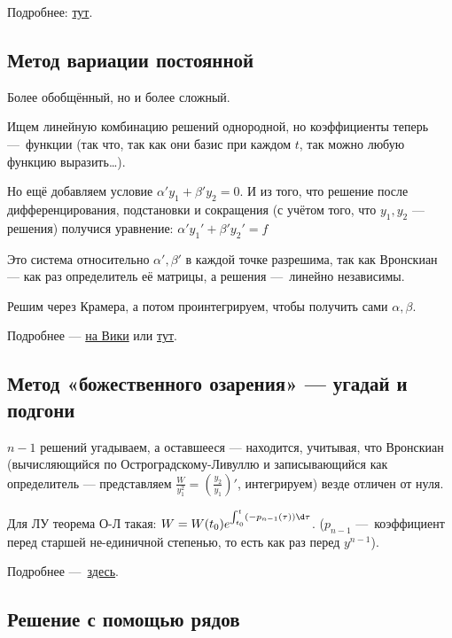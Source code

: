 \documentclass[12pt, a4paper]{article}
\begin{document}
Подробнее: \href{https://tutorial.math.lamar.edu/Classes/DE/UndeterminedCoefficients.aspx}{тут}.

\subsection{Метод вариации постоянной}

Более обобщённый, но и более сложный.

Ищем линейную комбинацию решений однородной, но коэффициенты теперь — функции (так что, так как они базис при каждом $t$, так можно любую функцию выразить…).

Но ещё добавляем условие $\alpha' y_1 + \beta' y_2 = 0$.
И из того, что решение после дифференцирования, подстановки и сокращения (с учётом того, что $y_1, y_2$ — решения) 
получися уравнение: $\alpha' y_1' + \beta' y_2' = f$

Это система относительно $\alpha', \beta'$ в каждой точке разрешима, так как Вронскиан — как раз определитель её матрицы, а решения — линейно независимы.

Решим через Крамера, а потом проинтегрируем, чтобы получить сами $\alpha, \beta$.

Подробнее — \href{https://en.wikipedia.org/wiki/Variation_of_parameters}{на Вики} 
или \href{https://tutorial.math.lamar.edu/classes/de/VariationofParameters.aspx}{тут}.

\subsection{Метод «божественного озарения» — угадай и подгони}

$n - 1$ решений угадываем, а оставшееся — находится, учитывая, 
что Вронскиан (вычисляющийся по Остроградскому-Ливуллю 
и записывающийся как определитель — 
представляем $\frac{W}{y_1^2} = \left(\frac{y_2}{y_1}\right)'$, интегрируем)
везде отличен от нуля.

Для ЛУ теорема О-Л такая: $W = W(t_0) e^{\int_{t_0}^t (-p_{n-1}(\tau)) \d \tau}$. ($p_{n - 1}$ — коэффициент перед старшей не-единичной степенью, то есть как раз перед $y^{n - 1}$).

Подробнее — \href{https://ru.wikipedia.org/wiki/%D0%A4%D0%BE%D1%80%D0%BC%D1%83%D0%BB%D0%B0_%D0%9B%D0%B8%D1%83%D0%B2%D0%B8%D0%BB%D0%BB%D1%8F_%E2%80%94_%D0%9E%D1%81%D1%82%D1%80%D0%BE%D0%B3%D1%80%D0%B0%D0%B4%D1%81%D0%BA%D0%BE%D0%B3%D0%BE}{здесь}.


\subsection{Решение с помощью рядов}
\end{document}
